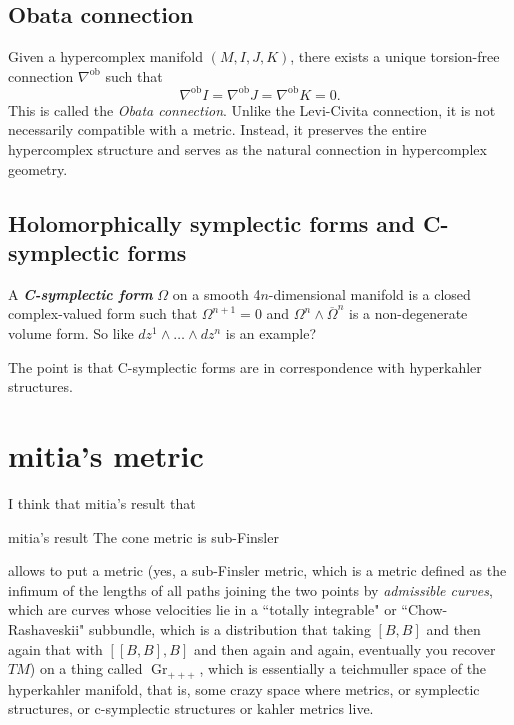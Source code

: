 \subsection{Obata connection}

\begin{remark}
    Given a hypercomplex manifold $(M, I, J, K)$, there exists a unique torsion-free connection $\nabla^{\operatorname{ob}}$ such that
    \[
    \nabla^{\operatorname{ob}} I = \nabla^{\operatorname{ob}} J = \nabla^{\operatorname{ob}} K = 0.
    \]
    This is called the \textit{Obata connection}. Unlike the Levi-Civita connection, it is not necessarily compatible with a metric. Instead, it preserves the entire hypercomplex structure and serves as the natural connection in hypercomplex geometry.
\end{remark}

\subsection{Holomorphically symplectic forms and C-symplectic forms}

A \textit{\textbf{C-symplectic form}} \(\Omega\) on a smooth 4\(n\)-dimensional manifold is a closed complex-valued form such that \(\Omega^{n+1}=0\) and \(\Omega^n \wedge \overline{ \Omega}^n\) is a non-degenerate volume form. So like \(dz^1 \wedge \ldots \wedge dz^n\) is an example?

The point is that C-symplectic forms are in correspondence with hyperkahler structures.

\section{mitia's metric}

I think that mitia's result that
\begin{thing6}{mitia's result}\leavevmode
The cone metric is sub-Finsler
\end{thing6}
allows to put a metric (yes, a sub-Finsler metric, which is a metric defined as the infimum of the lengths of all paths joining the two points by \textit{admissible curves}, which are curves whose velocities lie in a ``totally integrable" or ``Chow-Rashaveskii" subbundle, which is a distribution that taking \([B,B]\) and then again that with \([[B,B],B]\) and then again and again, eventually you recover \(TM\)) on a thing called \(\operatorname{Gr}_{+++}\), which is essentially a teichmuller space of the hyperkahler manifold, that is, some crazy space where metrics, or symplectic structures, or c-symplectic structures or kahler metrics live.

